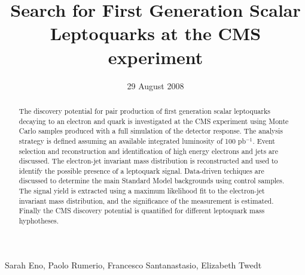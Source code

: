 \documentclass[colclass=cmspaper]{combine}
\begin{document}
\begin{linenumbers}
\pagestyle{combine}


\begin{titlepage}

   \date{29 August 2008}


  \title{Search for First Generation Scalar Leptoquarks at the CMS experiment}

  \begin{Authlist}
   Sarah Eno, Paolo Rumerio, Francesco Santanastasio, Elizabeth Twedt
  \end{Authlist}


  \begin{abstract}
    The discovery potential for pair production of first generation scalar leptoquarks 
    decaying to an electron and quark is investigated 
    at the CMS experiment using Monte Carlo samples produced with a full simulation of the detector response.  
    The analysis strategy is defined assuming an available integrated luminosity of 100 pb$^{-1}$.
    Event selection and reconstruction and identification of high energy electrons and jets are discussed.
    The electron-jet invariant mass distribution is reconstructed
    and used to identify the possible presence of a leptoquark signal.
    Data-driven techiques are discussed to determine the main Standard Model backgrounds using 
    control samples. The signal yield is extracted using a maximum likelihood fit to the 
    electron-jet invariant mass distribution, and the significance of the measurement is estimated.
    Finally the CMS discovery potential is quantified for different leptoquark mass hyphotheses.

  \end{abstract} 

\end{titlepage}


\end{linenumbers}
\end{document}
